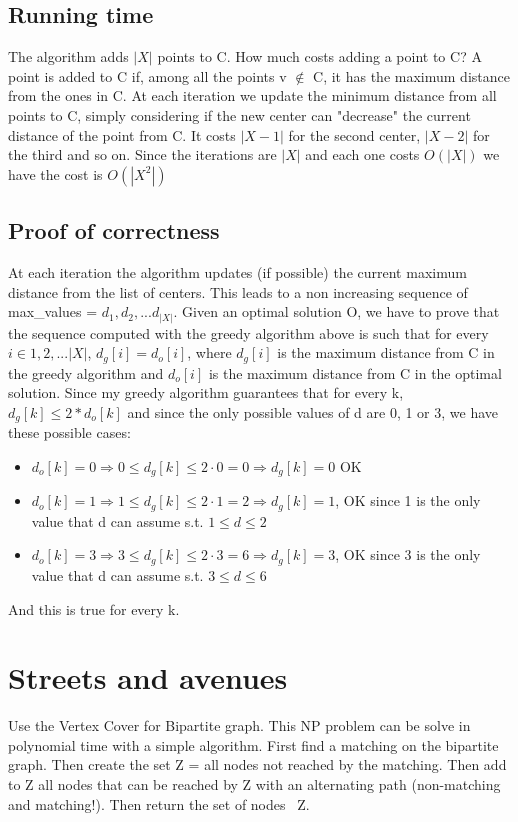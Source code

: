 \documentclass[12pt]{article}
\begin{document}
\subsection*{Running time}
The algorithm adds $|X|$ points to C. How much costs adding a point to C? A point is added to C if, among all the points v $\notin$ C, it has the maximum distance from the ones in C. At each iteration we update the minimum distance from all points to C, simply considering if the new center can "decrease" the current distance of the point from C. It costs $|X - 1|$ for the second center, $|X - 2|$ for the third and so on. Since the iterations are $|X|$ and each one costs $O(|X|)$ we have the cost is $O(|X^2|)$
\subsection*{Proof of correctness}
At each iteration the algorithm updates (if possible) the current maximum distance from the list of centers. This leads to a non increasing sequence of max\_values = ${d_1, d_2, ... d_{|X|}}$. Given an optimal solution O, we have to prove that the sequence computed with the greedy algorithm above is such that for every $i \in {1, 2, ... |X|}$, $d_g[i] = d_o[i] $, where $d_g[i]$ is the maximum distance from C in the greedy algorithm and $d_o[i]$ is the maximum distance from C in the optimal solution. Since my greedy algorithm guarantees that for every k, $d_g[k] \leq 2* d_o[k]$ and since the only possible values of d are 0, 1 or 3, we have these possible cases:
\begin{itemize}
	\item $d_o[k] = 0 \Rightarrow  0 \leq d_g[k] \leq 2\cdot0 = 0 \Rightarrow d_g[k] = 0$ OK
	\item $d_o[k] = 1 \Rightarrow  1 \leq d_g[k] \leq 2\cdot1 = 2 \Rightarrow d_g[k] = 1 $, OK since 1 is the only value that d can assume s.t. $1 \leq d \leq 2$
	\item $d_o[k] = 3 \Rightarrow  3 \leq d_g[k] \leq 2\cdot3 = 6 \Rightarrow d_g[k] = 3 $, OK since 3 is the only value that d can assume s.t. $3 \leq d \leq 6$
\end{itemize}
And this is true for every k.

\section{Streets and avenues}
Use the Vertex Cover for Bipartite graph. This NP problem can be solve in polynomial time with a simple algorithm. First find a matching on the bipartite graph. Then create the set Z = all nodes not reached by the matching. Then add to Z all nodes that can be reached by Z with an alternating path (non-matching and matching!). Then return the set of nodes \ Z.
\end{document}
